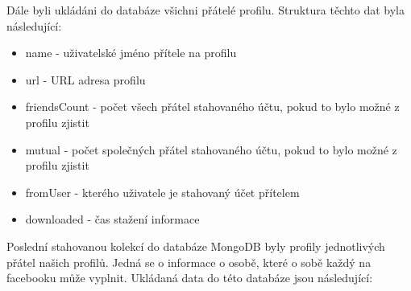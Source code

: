 \documentclass[thesis=M,czech]{FITthesis}[2013/05/10]
\begin{document}
Dále byli ukládáni do databáze všichni přátelé profilu. Struktura těchto dat byla následující:

\begin{itemize}
  \item name - uživatelské jméno přítele na profilu
  \item url - URL adresa profilu
  \item friendsCount - počet všech přátel stahovaného účtu, pokud to bylo možné z profilu zjistit
  \item mutual - počet společných přátel stahovaného účtu, pokud to bylo možné z profilu zjistit
  \item fromUser - kterého uživatele je stahovaný účet přítelem
  \item downloaded - čas stažení informace
\end{itemize}

Poslední stahovanou kolekcí do databáze MongoDB byly profily jednotlivých přátel našich profilů. Jedná se o informace o osobě, které o sobě každý na facebooku může vyplnit. Ukládaná data do této databáze jsou následující:
\end{document}

